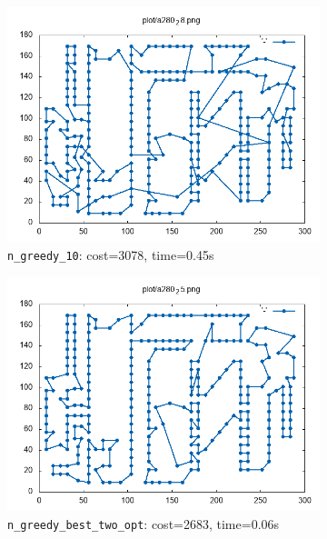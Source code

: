 \begin{figure}[!h]
	\begin{subfigure}{.5\columnwidth}
		\centering
		\includegraphics[width=\columnwidth]{../res/a280_28.png}
		\caption{\texttt{n\_greedy\_10}: cost=3078, time=0.45s}
		\label{fig:a280_10}
	\end{subfigure}
	\begin{subfigure}{.5\columnwidth}
		\centering
		\includegraphics[width=\columnwidth]{../res/a280_25.png}
		\caption{\texttt{n\_greedy\_best\_two\_opt}: cost=2683, time=0.06s}
		\label{fig:a280_25}
	\end{subfigure}
	\begin{subfigure}{.5\columnwidth}
		\centering

\end{subfigure}
\end{figure}
